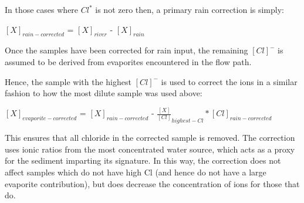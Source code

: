 

\bsk
\bsk


In those cases where $Cl^*$ is not zero then, a primary rain correction is simply:


\begin{center}
{\Large
$[X]_{rain-corrected}$  = $[X]_{river}$ - $[X]_{rain}$}

\end{center}

\bsk

Once the samples have been corrected for rain input, the remaining $[Cl]^{-}$ is assumed to be derived from evaporites encountered in the flow path. 

Hence, the sample with the highest $[Cl]^{-}$ is used to correct the ions in a similar fashion to how the most dilute sample was used above:

\begin{center}
{\Large
$[X]_{evaporite-corrected}$  = $[X]_{rain-corrected}$ - $\frac{[X]}{[Cl]}_{highest-Cl} * [Cl]_{rain-corrected}$}
\end{center}

This ensures that all chloride in the corrected sample is removed. 
The correction uses ionic ratios from the most concentrated water source, 
which acts as a proxy for the sediment imparting its signature. 
In this way, the correction does not affect samples which do not have high Cl 
(and hence do not have a large evaporite contribution), but does decrease the concentration of ions for those that do.

\bsk




